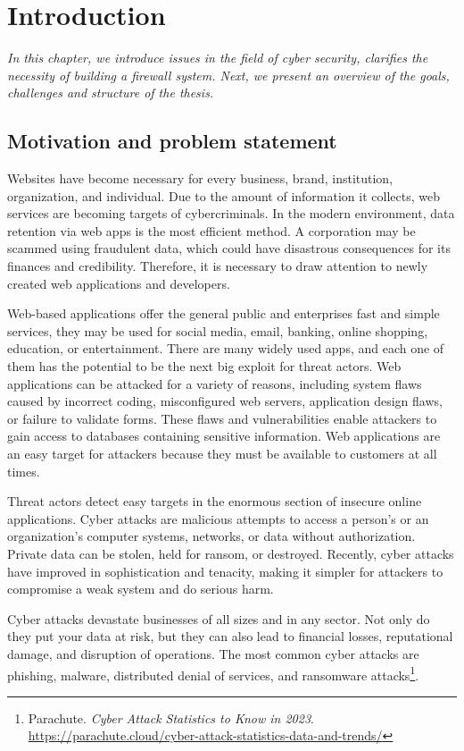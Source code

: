 \chapter{Introduction}
\label{chap:introduction}
	\textit{In this chapter, we introduce issues in the field of cyber security, clarifies the necessity of building a firewall system. Next, we present an overview of the goals, challenges and structure of the thesis.}
\minitoc

\section{Motivation and problem statement}
\label{sec:motivation}
Websites have become necessary for every business, brand, institution, organization, and individual. Due to the amount of information it collects, web services are becoming targets of cybercriminals. In the modern environment, data retention via web apps is the most efficient method. A corporation may be scammed using fraudulent data, which could have disastrous consequences for its finances and credibility.  Therefore, it is necessary to draw attention to newly created web applications and developers.

Web-based applications offer the general public and enterprises fast and simple services, they may be used for social media, email, banking, online shopping, education, or entertainment. There are many widely used apps, and each one of them has the potential to be the next big exploit for threat actors. Web applications can be attacked for a variety of reasons, including system flaws caused by incorrect coding, misconfigured web servers, application design flaws, or failure to validate forms. These flaws and vulnerabilities enable attackers to gain access to databases containing sensitive information. Web applications are an easy target for attackers because they must be available to customers at all times.

Threat actors detect easy targets in the enormous section of insecure online applications. Cyber attacks are malicious attempts to access a person's or an organization's computer systems, networks, or data without authorization. Private data can be stolen, held for ransom, or destroyed. Recently, cyber attacks have improved in sophistication and tenacity, making it simpler for attackers to compromise a weak system and do serious harm.

Cyber attacks devastate businesses of all sizes and in any sector. Not only do they put your data at risk, but they can also lead to financial losses, reputational damage, and disruption of operations. The most common cyber attacks are phishing, malware, distributed denial of services, and ransomware attacks\footnote{Parachute. \textit{Cyber Attack Statistics to Know in 2023}. \url{https://parachute.cloud/cyber-attack-statistics-data-and-trends/}}. 


